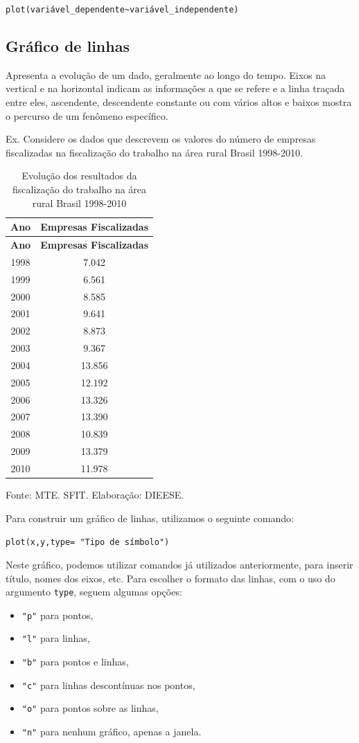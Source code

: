 \documentclass[12pt,portuguese,oneside]{book}
\providecommand{\tightlist}{%
  \setlength{\itemsep}{0pt}\setlength{\parskip}{0pt}}
\begin{document}
\texttt{plot(variável\_dependente\textasciitilde{}variável\_independente)}

\subsection{Gráfico de linhas}\label{grafico-de-linhas}

Apresenta a evolução de um dado, geralmente ao longo do tempo. Eixos na
vertical e na horizontal indicam as informações a que se refere e a
linha traçada entre eles, ascendente, descendente constante ou com
vários altos e baixos mostra o percurso de um fenômeno específico.

Ex. Considere os dados que descrevem os valores do número de empresas
fiscalizadas na fiscalização do trabalho na área rural Brasil 1998-2010.

\begin{longtable}[]{@{}cc@{}}
\caption{\label{tab:evolres}Evolução dos resultados da fiscalização do
trabalho na área rural Brasil 1998-2010}\tabularnewline
\toprule
\textbf{Ano} & \textbf{Empresas Fiscalizadas}\tabularnewline
\midrule
\endfirsthead
\toprule
\textbf{Ano} & \textbf{Empresas Fiscalizadas}\tabularnewline
\midrule
\endhead
1998 & 7.042\tabularnewline
1999 & 6.561\tabularnewline
2000 & 8.585\tabularnewline
2001 & 9.641\tabularnewline
2002 & 8.873\tabularnewline
2003 & 9.367\tabularnewline
2004 & 13.856\tabularnewline
2005 & 12.192\tabularnewline
2006 & 13.326\tabularnewline
2007 & 13.390\tabularnewline
2008 & 10.839\tabularnewline
2009 & 13.379\tabularnewline
2010 & 11.978\tabularnewline
\bottomrule
\end{longtable}

Fonte: MTE. SFIT. Elaboração: DIEESE.

Para construir um gráfico de linhas, utilizamos o seguinte comando:

\texttt{plot(x,y,type=\ "Tipo\ de\ símbolo")}

Neste gráfico, podemos utilizar comandos já utilizados anteriormente,
para inserir título, nomes dos eixos, etc. Para escolher o formato das
linhas, com o uso do argumento \texttt{type}, seguem algumas opções:

\begin{itemize}
\tightlist
\item
  \texttt{"p"} para pontos,
\item
  \texttt{"l"} para linhas,
\item
  \texttt{"b"} para pontos e linhas,
\item
  \texttt{"c"} para linhas descontínuas nos pontos,
\item
  \texttt{"o"} para pontos sobre as linhas,
\item
  \texttt{"n"} para nenhum gráfico, apenas a janela.
\end{itemize}
\end{document}
